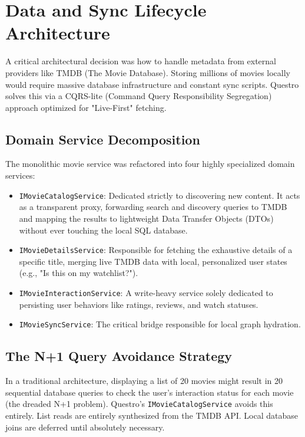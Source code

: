 \section{Data and Sync Lifecycle Architecture}
A critical architectural decision was how to handle metadata from external providers like TMDB (The Movie Database). Storing millions of movies locally would require massive database infrastructure and constant sync scripts. Questro solves this via a CQRS-lite (Command Query Responsibility Segregation) approach optimized for "Live-First" fetching.

\subsection{Domain Service Decomposition}
The monolithic movie service was refactored into four highly specialized domain services:
\begin{itemize}
    \item \texttt{IMovieCatalogService}: Dedicated strictly to discovering new content. It acts as a transparent proxy, forwarding search and discovery queries to TMDB and mapping the results to lightweight Data Transfer Objects (DTOs) without ever touching the local SQL database.
    \item \texttt{IMovieDetailsService}: Responsible for fetching the exhaustive details of a specific title, merging live TMDB data with local, personalized user states (e.g., "Is this on my watchlist?").
    \item \texttt{IMovieInteractionService}: A write-heavy service solely dedicated to persisting user behaviors like ratings, reviews, and watch statuses.
    \item \texttt{IMovieSyncService}: The critical bridge responsible for local graph hydration.
\end{itemize}

\subsection{The N+1 Query Avoidance Strategy}
In a traditional architecture, displaying a list of 20 movies might result in 20 sequential database queries to check the user's interaction status for each movie (the dreaded N+1 problem). Questro's \texttt{IMovieCatalogService} avoids this entirely. List reads are entirely synthesized from the TMDB API. Local database joins are deferred until absolutely necessary.


